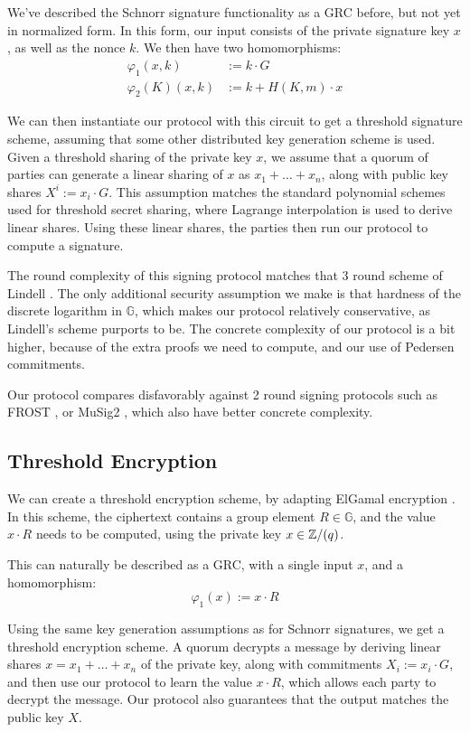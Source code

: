 We've described the Schnorr signature functionality as a GRC before,
but not yet in normalized form. In this form, our input consists
of the private signature key $x$, as well as the nonce $k$.
We then have two homomorphisms:
$$
\begin{aligned}
    \varphi_1(x, k) &:= k \cdot G\\
    \varphi_2(K)(x, k) &:= k + H(K, m) \cdot x
\end{aligned}
$$

We can then instantiate our protocol with this circuit to get a
threshold signature scheme, assuming that some other distributed
key generation scheme is used.
Given a threshold sharing of the private key $x$,
we assume that a quorum of parties can generate a linear sharing
of $x$ as $x_1 + \ldots + x_n$, along with public key shares $X^i := x_i \cdot G$.
This assumption matches the standard polynomial schemes used
for threshold secret sharing, where Lagrange interpolation is used
to derive linear shares.
Using these linear shares, the parties then run our protocol
to compute a signature.

The round complexity of this signing protocol matches
that 3 round scheme of Lindell \cite{lindell_simple_2022}.
The only additional security assumption we make is that hardness
of the discrete logarithm in $\mathbb{G}$, which makes our protocol
relatively conservative, as Lindell's scheme purports to be.
The concrete complexity of our protocol is a bit higher, because of
the extra proofs we need to compute, and our use of Pedersen commitments.

Our protocol compares disfavorably against 2 round signing protocols
such as FROST \cite{komlo_frost_2020}, or MuSig2 \cite{nick_musig2_2021},
which also have better concrete complexity.

\subsection{Threshold Encryption}
\label{sec:threshold_enc}

We can create a threshold encryption scheme, by adapting
ElGamal encryption \cite{elgamal_public_1985}.
In this scheme, the ciphertext contains a group element $R \in \mathbb{G}$,
and the value $x \cdot R$ needs to be computed, using the private key
$x \in \mathbb{Z}/(q)$. 

This can naturally be described as a GRC, with a single input $x$,
and a homomorphism:
$$
\varphi_1(x) := x \cdot R
$$

Using the same key generation assumptions as for Schnorr signatures,
we get a threshold encryption scheme.
A quorum decrypts a message by deriving linear shares $x = x_1 + \ldots + x_n$
of the private key, along with commitments $X_i := x_i \cdot G$,
and then use our protocol to learn the value $x \cdot R$,
which allows each party to decrypt the message.
Our protocol also guarantees that the output matches the public key $X$.

